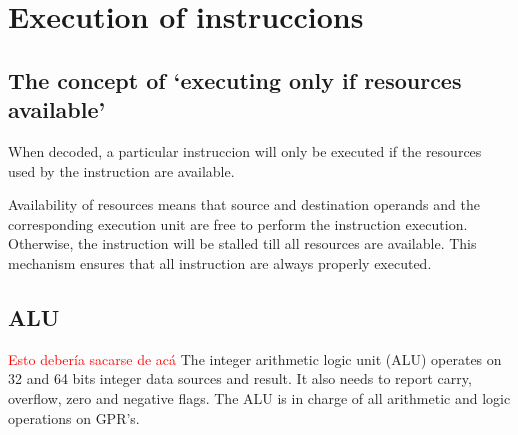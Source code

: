 \section{Execution of instruccions}

\subsection{The concept of `executing only if resources available'}
When decoded, a particular instruccion will only be executed if the resources used by the instruction are available.

Availability of resources means that source and destination operands and the corresponding execution unit are free
to perform the instruction execution. Otherwise, the instruction will be stalled till all resources are available.
This mechanism ensures that all instruction are always properly executed.

\subsection{ALU}
\textcolor{red}{Esto debería sacarse de acá}
The integer arithmetic logic unit (ALU) operates on 32 and 64 bits integer data sources and result. It also needs to
report carry, overflow, zero and negative flags. The ALU is in charge of all arithmetic and logic operations on GPR's.

